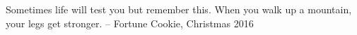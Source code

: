 \begin{center}
	\vspace{10cm}
	
	\begin{fancyquote}
		Sometimes life will test you but remember this. When you walk up a mountain, your legs get stronger.
		-- Fortune Cookie, Christmas 2016
	\end{fancyquote}
	
	\vspace{10cm}
\end{center}
